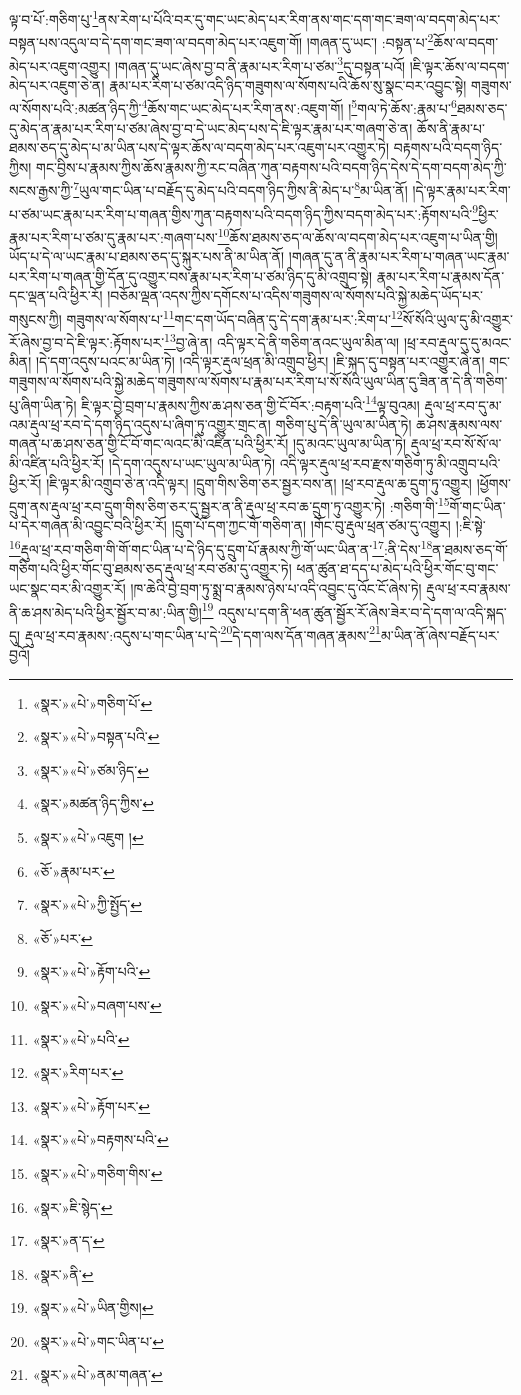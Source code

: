 ལྟ་བ་པོ་:གཅིག་པུ་\footnote{«སྣར་»«པེ་»གཅིག་པོ་}ནས་རེག་པ་པོའི་བར་དུ་གང་ཡང་མེད་པར་རིག་ནས་གང་དག་གང་ཟག་ལ་བདག་མེད་པར་བསྟན་པས་འདུལ་བ་དེ་དག་གང་ཟག་ལ་བདག་མེད་པར་འཇུག་གོ། །གཞན་དུ་ཡང་། :བསྟན་པ་\footnote{«སྣར་»«པེ་»བསྟན་པའི་}ཆོས་ལ་བདག་མེད་པར་འཇུག་འགྱུར། །གཞན་དུ་ཡང་ཞེས་བྱ་བ་ནི་རྣམ་པར་རིག་པ་ཙམ་\footnote{«སྣར་»«པེ་»ཙམ་ཉིད་}དུ་བསྟན་པའོ། །ཇི་ལྟར་ཆོས་ལ་བདག་མེད་པར་འཇུག་ཅེ་ན། རྣམ་པར་རིག་པ་ཙམ་འདི་ཉིད་གཟུགས་ལ་སོགས་པའི་ཆོས་སུ་སྣང་བར་འབྱུང་སྟེ། གཟུགས་ལ་སོགས་པའི་:མཚན་ཉིད་ཀྱི་\footnote{«སྣར་»མཚན་ཉིད་ཀྱིས་}ཆོས་གང་ཡང་མེད་པར་རིག་ནས་:འཇུག་གོ། །\footnote{«སྣར་»«པེ་»འཇུག །}གལ་ཏེ་ཆོས་:རྣམ་པ་\footnote{«ཅོ་»རྣམ་པར་}ཐམས་ཅད་དུ་མེད་ན་རྣམ་པར་རིག་པ་ཙམ་ཞེས་བྱ་བ་དེ་ཡང་མེད་པས་དེ་ཇི་ལྟར་རྣམ་པར་གཞག་ཅེ་ན། ཆོས་ནི་རྣམ་པ་ཐམས་ཅད་དུ་མེད་པ་མ་ཡིན་པས་དེ་ལྟར་ཆོས་ལ་བདག་མེད་པར་འཇུག་པར་འགྱུར་ཏེ། བརྟགས་པའི་བདག་ཉིད་ཀྱིས། གང་བྱིས་པ་རྣམས་ཀྱིས་ཆོས་རྣམས་ཀྱི་རང་བཞིན་ཀུན་བརྟགས་པའི་བདག་ཉིད་དེས་དེ་དག་བདག་མེད་ཀྱི་སངས་རྒྱས་ཀྱི་\footnote{«སྣར་»«པེ་»ཀྱི་སྤྱོད་}ཡུལ་གང་ཡིན་པ་བརྗོད་དུ་མེད་པའི་བདག་ཉིད་ཀྱིས་ནི་མེད་པ་\footnote{«ཅོ་»པར་}མ་ཡིན་ནོ། །དེ་ལྟར་རྣམ་པར་རིག་པ་ཙམ་ཡང་རྣམ་པར་རིག་པ་གཞན་གྱིས་ཀུན་བརྟགས་པའི་བདག་ཉིད་ཀྱིས་བདག་མེད་པར་:རྟོགས་པའི་\footnote{«སྣར་»«པེ་»རྟོག་པའི་}ཕྱིར་རྣམ་པར་རིག་པ་ཙམ་དུ་རྣམ་པར་:གཞག་པས་\footnote{«སྣར་»«པེ་»བཞག་པས་}ཆོས་ཐམས་ཅད་ལ་ཆོས་ལ་བདག་མེད་པར་འཇུག་པ་ཡིན་གྱི། ཡོད་པ་དེ་ལ་ཡང་རྣམ་པ་ཐམས་ཅད་དུ་སྐུར་པས་ནི་མ་ཡིན་ནོ། །གཞན་དུ་ན་ནི་རྣམ་པར་རིག་པ་གཞན་ཡང་རྣམ་པར་རིག་པ་གཞན་གྱི་དོན་དུ་འགྱུར་བས་རྣམ་པར་རིག་པ་ཙམ་ཉིད་དུ་མི་འགྲུབ་སྟེ། རྣམ་པར་རིག་པ་རྣམས་དོན་དང་ལྡན་པའི་ཕྱིར་རོ། །བཅོམ་ལྡན་འདས་ཀྱིས་དགོངས་པ་འདིས་གཟུགས་ལ་སོགས་པའི་སྐྱེ་མཆེད་ཡོད་པར་གསུངས་ཀྱི། གཟུགས་ལ་སོགས་པ་\footnote{«སྣར་»«པེ་»པའི་}གང་དག་ཡོད་བཞིན་དུ་དེ་དག་རྣམ་པར་:རིག་པ་\footnote{«སྣར་»རིག་པར་}སོ་སོའི་ཡུལ་དུ་མི་འགྱུར་རོ་ཞེས་བྱ་བ་དེ་ཇི་ལྟར་:རྟོགས་པར་\footnote{«སྣར་»«པེ་»རྟོག་པར་}བྱ་ཞེ་ན། འདི་ལྟར་དེ་ནི་གཅིག་ནའང་ཡུལ་མིན་ལ། །ཕྲ་རབ་རྡུལ་དུ་དུ་མའང་མིན། །དེ་དག་འདུས་པའང་མ་ཡིན་ཏེ། །འདི་ལྟར་རྡུལ་ཕྲན་མི་འགྲུབ་ཕྱིར། །ཇི་སྐད་དུ་བསྟན་པར་འགྱུར་ཞེ་ན། གང་གཟུགས་ལ་སོགས་པའི་སྐྱེ་མཆེད་གཟུགས་ལ་སོགས་པ་རྣམ་པར་རིག་པ་སོ་སོའི་ཡུལ་ཡིན་དུ་ཟིན་ན་དེ་ནི་གཅིག་པུ་ཞིག་ཡིན་ཏེ། ཇི་ལྟར་བྱེ་བྲག་པ་རྣམས་ཀྱིས་ཆ་ཤས་ཅན་གྱི་ངོ་བོར་:བརྟག་པའི་\footnote{«སྣར་»«པེ་»བརྟགས་པའི་}ལྟ་བུའམ། རྡུལ་ཕྲ་རབ་དུ་མ་འམ་རྡུལ་ཕྲ་རབ་དེ་དག་ཉིད་འདུས་པ་ཞིག་ཏུ་འགྱུར་གྲང་ན། གཅིག་པུ་དེ་ནི་ཡུལ་མ་ཡིན་ཏེ། ཆ་ཤས་རྣམས་ལས་གཞན་པ་ཆ་ཤས་ཅན་གྱི་ངོ་བོ་གང་ལའང་མི་འཛིན་པའི་ཕྱིར་རོ། །དུ་མའང་ཡུལ་མ་ཡིན་ཏེ། རྡུལ་ཕྲ་རབ་སོ་སོ་ལ་མི་འཛིན་པའི་ཕྱིར་རོ། །དེ་དག་འདུས་པ་ཡང་ཡུལ་མ་ཡིན་ཏེ། འདི་ལྟར་རྡུལ་ཕྲ་རབ་རྫས་གཅིག་ཏུ་མི་འགྲུབ་པའི་ཕྱིར་རོ། །ཇི་ལྟར་མི་འགྲུབ་ཅེ་ན་འདི་ལྟར། །དྲུག་གིས་ཅིག་ཅར་སྦྱར་བས་ན། །ཕྲ་རབ་རྡུལ་ཆ་དྲུག་ཏུ་འགྱུར། །ཕྱོགས་དྲུག་ནས་རྡུལ་ཕྲ་རབ་དྲུག་གིས་ཅིག་ཅར་དུ་སྦྱར་ན་ནི་རྡུལ་ཕྲ་རབ་ཆ་དྲུག་ཏུ་འགྱུར་ཏེ། :གཅིག་གི་\footnote{«སྣར་»«པེ་»གཅིག་གིས་}གོ་གང་ཡིན་པ་དེར་གཞན་མི་འབྱུང་བའི་ཕྱིར་རོ། །དྲུག་པོ་དག་ཀྱང་གོ་གཅིག་ན། །གོང་བུ་རྡུལ་ཕྲན་ཙམ་དུ་འགྱུར། །:ཇི་སྟེ་\footnote{«སྣར་»ཇི་སྙེད་}རྡུལ་ཕྲ་རབ་གཅིག་གི་གོ་གང་ཡིན་པ་དེ་ཉིད་དུ་དྲུག་པོ་རྣམས་ཀྱི་གོ་ཡང་ཡིན་ན་\footnote{«སྣར་»ན་ད་}:ནི་དེས་\footnote{«སྣར་»ནི་}ན་ཐམས་ཅད་གོ་གཅིག་པའི་ཕྱིར་གོང་བུ་ཐམས་ཅད་རྡུལ་ཕྲ་རབ་ཙམ་དུ་འགྱུར་ཏེ། ཕན་ཚུན་ཐ་དད་པ་མེད་པའི་ཕྱིར་གོང་བུ་གང་ཡང་སྣང་བར་མི་འགྱུར་རོ། །ཁ་ཆེའི་བྱེ་བྲག་ཏུ་སྨྲ་བ་རྣམས་ཉེས་པ་འདི་འབྱུང་དུ་འོང་ངོ་ཞེས་ཏེ། རྡུལ་ཕྲ་རབ་རྣམས་ནི་ཆ་ཤས་མེད་པའི་ཕྱིར་སྦྱོར་བ་མ་:ཡིན་གྱི།\footnote{«སྣར་»«པེ་»ཡིན་གྱིས།} འདུས་པ་དག་ནི་ཕན་ཚུན་སྦྱོར་རོ་ཞེས་ཟེར་བ་དེ་དག་ལ་འདི་སྐད་དུ། རྡུལ་ཕྲ་རབ་རྣམས་:འདུས་པ་གང་ཡིན་པ་དེ་\footnote{«སྣར་»«པེ་»གང་ཡིན་པ་}དེ་དག་ལས་དོན་གཞན་རྣམས་\footnote{«སྣར་»«པེ་»ནམ་གཞན་}མ་ཡིན་ནོ་ཞེས་བརྗོད་པར་བྱའོ། 